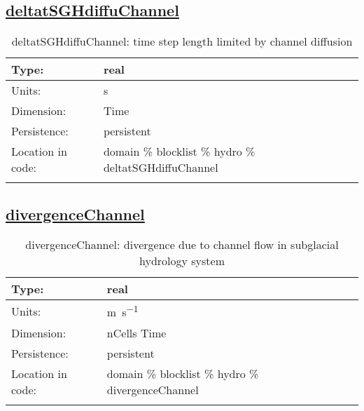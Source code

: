 \subsection[deltatSGHdiffuChannel]{\hyperref[sec:var_tab_hydro]{deltatSGHdiffuChannel}}
\label{subsec:var_sec_hydro_deltatSGHdiffuChannel}
\begin{center}
\begin{longtable}{| p{2.0in} | p{4.0in} |}
        \hline 
        Type: & real \\
        \hline 
        Units: & \si{s} \\
        \hline 
        Dimension: & Time \\
        \hline 
        Persistence: & persistent \\
        \hline 
         Location in code: & domain \% blocklist \% hydro \% deltatSGHdiffuChannel \\
         \hline 
    \caption{deltatSGHdiffuChannel: time step length limited by channel diffusion}
\end{longtable}
\end{center}
\subsection[divergenceChannel]{\hyperref[sec:var_tab_hydro]{divergenceChannel}}
\label{subsec:var_sec_hydro_divergenceChannel}
\begin{center}
\begin{longtable}{| p{2.0in} | p{4.0in} |}
        \hline 
        Type: & real \\
        \hline 
        Units: & \si{m.s^{-1}} \\
        \hline 
        Dimension: & nCells Time \\
        \hline 
        Persistence: & persistent \\
        \hline 
         Location in code: & domain \% blocklist \% hydro \% divergenceChannel \\
         \hline 
    \caption{divergenceChannel: divergence due to channel flow in subglacial hydrology system}
\end{longtable}
\end{center}
